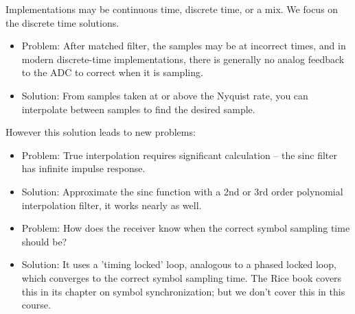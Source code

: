 Implementations may be continuous time, discrete time, or a
    mix.  We focus on the discrete time solutions.
\begin{itemize}
  \item Problem:  After matched filter, the samples may be at
    incorrect times, and in modern discrete-time implementations, there
    is generally no analog feedback to the ADC to correct when it is sampling.
  \item Solution:  From samples taken at or above the Nyquist rate,
    you can interpolate between samples to find the desired sample.
\end{itemize}
However this solution leads to new problems:
\begin{itemize}
  \item Problem:  True interpolation requires significant
    calculation -- the sinc filter has infinite impulse response.
  \item Solution:  Approximate the sinc function with a 2nd or 3rd
    order polynomial interpolation filter, it works nearly as well.
\end{itemize}
\begin{itemize}
  \item Problem:  How does the receiver know when the correct symbol sampling
  time should be?
  \item Solution:  It uses a 'timing locked' loop, analogous to a phased locked loop, which converges to the correct symbol sampling time.  The Rice book covers this in its chapter on symbol synchronization; but we don't cover this in this course.
\end{itemize}

